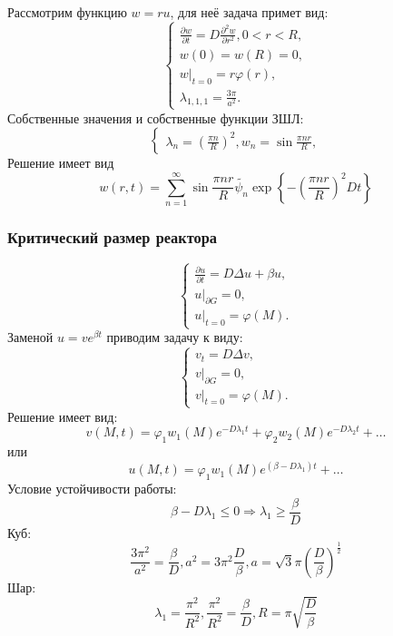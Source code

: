 \documentclass[11pt]{article}
\begin{document}
Рассмотрим функцию $w = ru$, для неё задача примет вид:
\begin{equation}
\begin{cases}
\frac{\partial w}{\partial t} = D\frac{\partial^2 w}{\partial r^2}, 0 < r < R, \\
w(0) = w(R) = 0, \\
w|_{t = 0} = r\varphi(r) , \\
\lambda_{1, 1, 1} = \frac{3\pi}{a^2}.
\end{cases}
\end{equation}
Собственные значения и собственные функции ЗШЛ:
\begin{equation}
\begin{cases}
\lambda_n = \left(\frac{\pi n}R\right)^2, w_n = \sin\frac{\pi nr}R,
\end{cases}
\end{equation}
Решение имеет вид
\begin{equation}
w(r, t) = \sum_{n = 1}^{\infty}\sin\frac{\pi nr}R\tilde{\psi_n}\exp\left\{-\left(\frac{\pi nr}R\right)^2Dt\right\}
\end{equation}
\subsubsection{Критический размер реактора}
\label{sec:org3a8c4b8}
\begin{equation}
\begin{cases}
\frac{\partial u}{\partial t} = D\Delta u + \beta u, \\
u|_{\partial G} = 0, \\
u|_{t = 0} = \varphi(M).
\end{cases}
\end{equation}
Заменой $u = ve^{\beta t}$ приводим задачу к виду:
\begin{equation}
\begin{cases}
v_t = D\Delta v, \\
v|_{\partial G} = 0, \\
v|_{t = 0} = \varphi(M).
\end{cases}
\end{equation}
Решение имеет вид:
\begin{equation}
v(M, t) = \varphi_1w_1(M)e^{-D\lambda_1t} + \varphi_2w_2(M)e^{-D\lambda_2t} + \ldots
\end{equation}
или
\begin{equation}
u(M, t) = \varphi_1w_1(M)e^{(\beta - D\lambda_1)t} + \ldots
\end{equation}
Условие устойчивости работы:
\begin{equation}
\beta - D\lambda_1 \leq 0 \Rightarrow \lambda_1 \geq \frac{\beta}D
\end{equation}
Куб:
\begin{equation}
\frac{3\pi^2}{a^2} = \frac{\beta}D, a^2 = 3\pi^2\frac{D}{\beta}, a = \sqrt{3}\pi\left(\frac{D}{\beta}\right)^\frac12
\end{equation}
Шар:
\begin{equation}
\lambda_1 = \frac{\pi^2}{R^2}, \frac{\pi^2}{R^2} = \frac{\beta}D, R = \pi\sqrt{\frac{D}{\beta}}
\end{equation}
\end{document}
